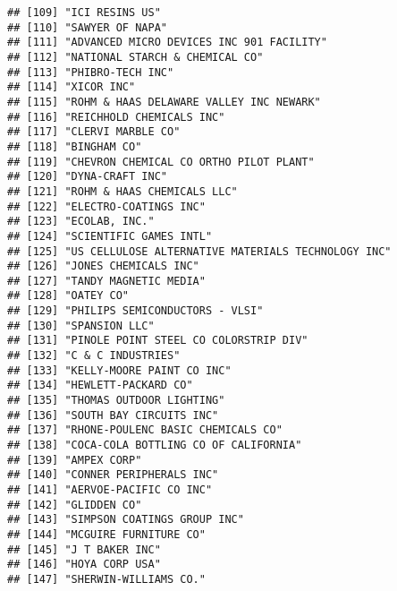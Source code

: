 \documentclass[
]{book}
\begin{document}
\begin{verbatim}
## [109] "ICI RESINS US"                                           
## [110] "SAWYER OF NAPA"                                          
## [111] "ADVANCED MICRO DEVICES INC 901 FACILITY"                 
## [112] "NATIONAL STARCH & CHEMICAL CO"                           
## [113] "PHIBRO-TECH INC"                                         
## [114] "XICOR INC"                                               
## [115] "ROHM & HAAS DELAWARE VALLEY INC NEWARK"                  
## [116] "REICHHOLD CHEMICALS INC"                                 
## [117] "CLERVI MARBLE CO"                                        
## [118] "BINGHAM CO"                                              
## [119] "CHEVRON CHEMICAL CO ORTHO PILOT PLANT"                   
## [120] "DYNA-CRAFT INC"                                          
## [121] "ROHM & HAAS CHEMICALS LLC"                               
## [122] "ELECTRO-COATINGS INC"                                    
## [123] "ECOLAB, INC."                                            
## [124] "SCIENTIFIC GAMES INTL"                                   
## [125] "US CELLULOSE ALTERNATIVE MATERIALS TECHNOLOGY INC"       
## [126] "JONES CHEMICALS INC"                                     
## [127] "TANDY MAGNETIC MEDIA"                                    
## [128] "OATEY CO"                                                
## [129] "PHILIPS SEMICONDUCTORS - VLSI"                           
## [130] "SPANSION LLC"                                            
## [131] "PINOLE POINT STEEL CO COLORSTRIP DIV"                    
## [132] "C & C INDUSTRIES"                                        
## [133] "KELLY-MOORE PAINT CO INC"                                
## [134] "HEWLETT-PACKARD CO"                                      
## [135] "THOMAS OUTDOOR LIGHTING"                                 
## [136] "SOUTH BAY CIRCUITS INC"                                  
## [137] "RHONE-POULENC BASIC CHEMICALS CO"                        
## [138] "COCA-COLA BOTTLING CO OF CALIFORNIA"                     
## [139] "AMPEX CORP"                                              
## [140] "CONNER PERIPHERALS INC"                                  
## [141] "AERVOE-PACIFIC CO INC"                                   
## [142] "GLIDDEN CO"                                              
## [143] "SIMPSON COATINGS GROUP INC"                              
## [144] "MCGUIRE FURNITURE CO"                                    
## [145] "J T BAKER INC"                                           
## [146] "HOYA CORP USA"                                           
## [147] "SHERWIN-WILLIAMS CO."                                    

\end{verbatim}
\end{document}
